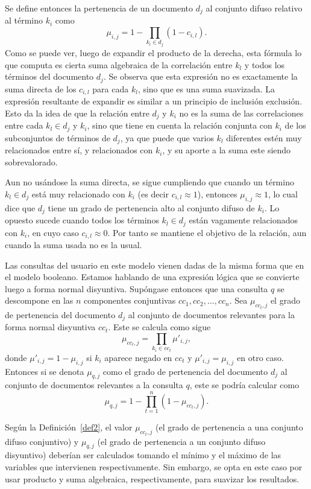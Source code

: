 \documentclass{llncs}
\begin{document}
	Se define entonces la pertenencia de un documento $d_j$ al conjunto difuso relativo al t\'ermino $k_i$ como
	\[ \mu_{i,j} =  1 - \prod_{k_l \in d_j} (1 - c_{i,l}).\]
	Como se puede ver, luego de expandir el producto de la derecha, esta f\'ormula lo que computa es cierta suma algebraica de la correlaci\'on entre $k_l$ y todos los t\'erminos del documento $d_j$. Se observa que esta expresi\'on no es exactamente la suma directa de los $c_{i,l}$ para cada $k_l$, sino que es una suma suavizada. La expresi\'on resultante de expandir es similar a un principio de inclusi\'on exclusi\'on. Esto da la idea de que la relaci\'on entre $d_j$ y $k_i$ no es la suma de las correlaciones entre cada $k_l \in d_j$ y  $k_i$, sino que tiene en cuenta la relaci\'on conjunta con $k_i$ de los subconjuntos de t\'erminos de $d_j$, ya que puede que varios $k_l$ diferentes est\'en muy relacionados entre s\'i, y relacionados con  $k_i$, y su aporte a la suma este siendo sobrevalorado. 
	
	Aun no us\'andose la suma directa, se sigue cumpliendo que cuando un t\'ermino  $k_l \in d_j$ est\'a muy relacionado con $k_i$ (es decir $c_{i,l} \approx 1$), entonces $\mu_{i,j} \approx 1$, lo cual dice que $d_j$ tiene un grado de pertenencia alto al conjunto difuso de $k_i$. Lo opuesto sucede cuando todos los t\'erminos $k_l \in d_j$ est\'an vagamente relacionados con $k_i$, en cuyo caso $c_{i,l} \approx 0$. Por tanto se mantiene el objetivo de la relaci\'on, aun cuando la suma usada no es la usual.
	
	Las consultas del usuario en este modelo vienen dadas de la misma forma que en el modelo booleano. Estamos hablando de una expresi\'on l\'ogica que se convierte luego a forma normal disyuntiva. Sup\'ongase entonces que una consulta $q$ se descompone en las $n$ componentes conjuntivas $cc_1, cc_2 , \dots, cc_n$. Sea $\mu_{cc_t,j}$ el grado de pertenencia del documento $d_j$ al conjunto de documentos relevantes para la forma normal disyuntiva $cc_t$. Este se calcula como sigue
	\[
	\mu_{cc_t,j} = \prod_{k_i \in cc_t} \mu'_{i,j}, 
	\]
	donde $\mu'_{i,j} = 1 - \mu_{i,j}$ si $k_i$ aparece negado en $cc_t$ y $\mu'_{i,j} =  \mu_{i,j}$ en otro caso. Entonces si se denota $\mu_{q,j}$ como el grado de pertenencia del documento $d_j$ al conjunto de documentos relevantes a la consulta $q$, este se podr\'ia calcular como
	\[
	\mu_{q,j} = 1 - \prod_{t=1}^n (1 - \mu_{cc_t,j}).
	\]
	
	Seg\'un la Definici\'on~\ref{def2}, el valor $\mu_{cc_t,j}$ (el grado de pertenencia a una conjunto difuso conjuntivo) y $\mu_{q,j}$ (el grado de pertenencia a un conjunto difuso disyuntivo) deber\'ian ser calculados tomando el m\'inimo y el m\'aximo de las variables que intervienen respectivamente. Sin embargo, se opta en este caso por usar producto y suma algebraica, respectivamente, para suavizar los resultados.
	
\end{document}
